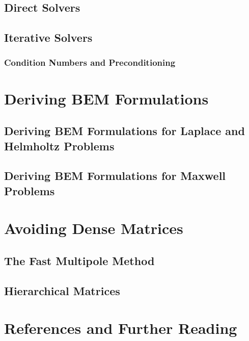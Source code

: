 \documentclass[a4paper]{book}
\begin{document}
\section{Direct Solvers}



\section{Iterative Solvers}



\subsection{Condition Numbers and Preconditioning}



\chapter{Deriving BEM Formulations}



\section{Deriving BEM Formulations for Laplace and Helmholtz Problems}



\section{Deriving BEM Formulations for Maxwell Problems}



\chapter{Avoiding Dense Matrices}



\section{The Fast Multipole Method}



\section{Hierarchical Matrices}



\chapter{References and Further Reading}
\end{document}
